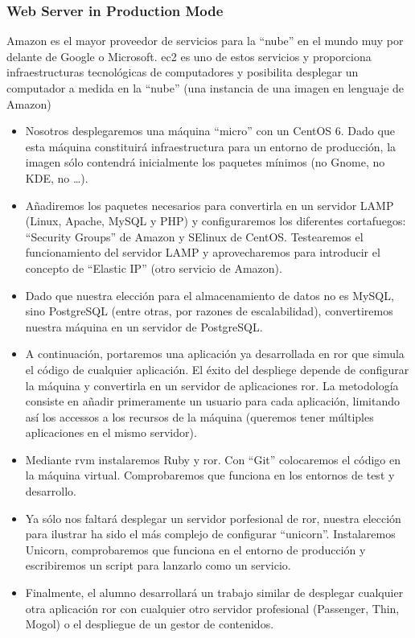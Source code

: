 \documentclass{beamer}
\begin{document}
\begin{frame}
\frametitle{Web Server in Production Mode}
Amazon es el mayor proveedor de servicios para la ``nube'' en el mundo muy por delante de Google o Microsoft.
\acrfull{ec2} es uno de estos servicios y proporciona infraestructuras tecnológicas de computadores y posibilita
desplegar un computador a medida en la ``nube'' (una instancia de una imagen en lenguaje de Amazon)

\begin{itemize}
\item Nosotros desplegaremos una máquina ``micro'' con un CentOS 6.
Dado que esta máquina constituirá infraestructura para un entorno de producción, la imagen sólo contendrá inicialmente los paquetes mínimos (no Gnome, no KDE, no \dots).

\item Añadiremos los paquetes necesarios para convertirla en un servidor LAMP (Linux, Apache, MySQL y PHP) y configuraremos los diferentes cortafuegos: ``Security Groups'' de Amazon y SElinux de CentOS.
Testearemos el funcionamiento del servidor LAMP y aprovecharemos para introducir el concepto de ``Elastic IP'' (otro servicio de Amazon).

\item Dado que nuestra elección para el almacenamiento de datos no es MySQL, sino PostgreSQL (entre otras, por  razones de escalabilidad), convertiremos nuestra máquina en un servidor de PostgreSQL.

\item A continuación, portaremos una aplicación ya desarrollada en \acrfull{ror} que simula el código de cualquier aplicación. El éxito del despliege depende de configurar la máquina y convertirla en un servidor de aplicaciones \acrshort{ror}.
La metodología consiste en añadir primeramente un usuario para cada aplicación, limitando así los accessos a los recursos de la máquina (queremos tener múltiples aplicaciones en el mismo servidor).

\item Mediante \acrfull{rvm} instalaremos Ruby y \acrshort{ror}. Con ``Git''  colocaremos el código en la máquina virtual. Comprobaremos que funciona en los entornos de test y desarrollo.

\item Ya sólo nos faltará desplegar  un servidor porfesional de \acrshort{ror}, nuestra elección para ilustrar ha sido el más complejo de configurar ``unicorn''. Instalaremos Unicorn, comprobaremos que funciona en el entorno de producción y escribiremos un script para lanzarlo como un servicio.

\item Finalmente, el alumno desarrollará un trabajo similar de desplegar cualquier otra aplicación \acrshort{ror} con cualquier otro servidor profesional (Passenger, Thin, Mogol) o el despliegue de un gestor de contenidos.

\end{itemize}
\end{frame}
\end{document}

